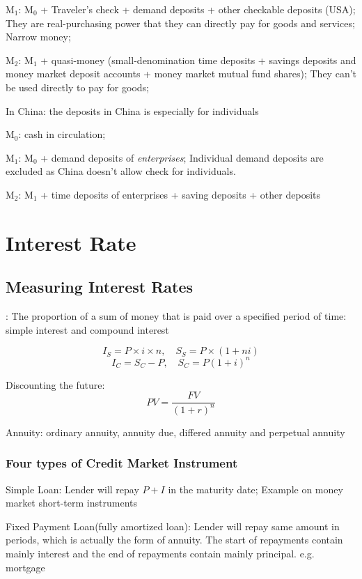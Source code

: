 \documentclass[10pt, a4paper]{article}
\begin{document}
        \quad $\text{M}_1$: $\text{M}_0$ + Traveler's check + demand deposits + other checkable deposits (USA); They are real-purchasing power that they can directly pay for goods and services; Narrow money; 
        
        \quad $\text{M}_2$: $\text{M}_1$ + quasi-money (small-denomination time deposits + savings deposits and money market deposit accounts + money market mutual fund shares); They can't be used directly to pay for goods;

        In China: the deposits in China is especially for individuals

        \quad $\text{M}_0$: cash in circulation;
        
        \quad $\text{M}_1$: $\text{M}_0$ + demand deposits of \emph{enterprises}; Individual demand deposits are excluded as China doesn't allow check for individuals.

        \quad $\text{M}_2$: $\text{M}_1$ + time deposits of enterprises + saving deposits + other deposits

\section{Interest Rate}
    \subsection{Measuring Interest Rates}: 
        The proportion of a sum of money that is paid over a specified period of time: simple interest and compound interest

        $$I_S = P \times i \times n,\quad  S_S = P \times (1 + ni)$$
        $$I_C = S_C - P,\quad S_C = P(1 + i)^n$$

        Discounting the future: 
        $$PV = \frac{FV}{(1 + r)^n}$$

        Annuity: ordinary annuity, annuity due, differed annuity and perpetual annuity 

        \subsubsection{Four types of Credit Market Instrument} 

        \quad Simple Loan:  Lender will repay $P + I$ in the maturity date; Example on money market short-term instruments

        \quad Fixed Payment Loan(fully amortized loan): Lender will repay same amount in periods, which is actually the form of annuity. The start of repayments contain mainly interest and the end of repayments contain mainly principal. e.g. mortgage
\end{document}
